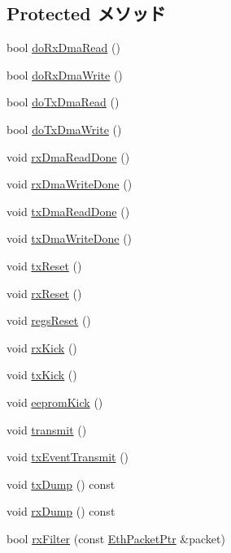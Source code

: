 \subsection*{Protected メソッド}
\begin{DoxyCompactItemize}
\item 
bool \hyperlink{classNSGigE_a76972a99f5ea91b5b7e553f4dc521bc0}{doRxDmaRead} ()
\item 
bool \hyperlink{classNSGigE_aa974360bfc0dae7adca2aa197e83c044}{doRxDmaWrite} ()
\item 
bool \hyperlink{classNSGigE_a3e71461dcffb91d5053640871a4a7373}{doTxDmaRead} ()
\item 
bool \hyperlink{classNSGigE_aa826aa2281d09f6d6af76daee3c1795b}{doTxDmaWrite} ()
\item 
void \hyperlink{classNSGigE_a1124e0dc2f6fa5b5f20f4ee918f5c83e}{rxDmaReadDone} ()
\item 
void \hyperlink{classNSGigE_a932a4e848e07e1c3ece5cd2c2ee272a8}{rxDmaWriteDone} ()
\item 
void \hyperlink{classNSGigE_a440664c31d5692df3612ac03e709745f}{txDmaReadDone} ()
\item 
void \hyperlink{classNSGigE_a1129265b8bad8421a16a980530a1184f}{txDmaWriteDone} ()
\item 
void \hyperlink{classNSGigE_a447fd38bd74f85433761a6a2b73454e2}{txReset} ()
\item 
void \hyperlink{classNSGigE_a1a0188deba4ff118207f71786ca147e6}{rxReset} ()
\item 
void \hyperlink{classNSGigE_a95f08ef8a29a3d148385bd455cb58f49}{regsReset} ()
\item 
void \hyperlink{classNSGigE_a5fa946a73db6f59c9819d457c991486a}{rxKick} ()
\item 
void \hyperlink{classNSGigE_ac5484e8debdd6a2d3cf4c2902b832a76}{txKick} ()
\item 
void \hyperlink{classNSGigE_afa6a9bad7d4134cee335eae4b127d3b0}{eepromKick} ()
\item 
void \hyperlink{classNSGigE_af04463ca216d10ffa94db8463cee04c9}{transmit} ()
\item 
void \hyperlink{classNSGigE_a2b61c48d7a63b50007517c67e35dfd20}{txEventTransmit} ()
\item 
void \hyperlink{classNSGigE_afe787c5d7928546256f34b65f485be32}{txDump} () const 
\item 
void \hyperlink{classNSGigE_aa1b380dc961134ace0f88ee7743b32b6}{rxDump} () const 
\item 
bool \hyperlink{classNSGigE_a5bcec2e17f6aca766b063f7a92289bdb}{rxFilter} (const \hyperlink{classRefCountingPtr}{EthPacketPtr} \&packet)

\end{DoxyCompactItemize}
